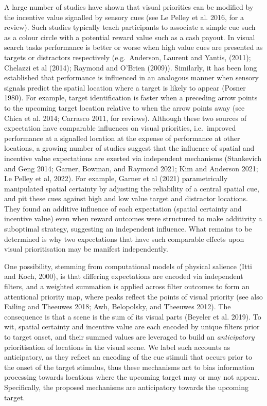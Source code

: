 \documentclass[11pt,halfline,a4paper,]{ouparticle}
\begin{document}
A large number of studies have shown that visual priorities can be modified by the incentive value signalled by sensory cues (see Le Pelley et al. 2016, for a review). Such studies typically teach participants to associate a simple cue such as a colour circle with a potential reward value such as a cash payout. In visual search tasks performance is better or worse when high value cues are presented as targets or distractors respectively (e.g.~Anderson, Laurent and Yantis, (2011); Chelazzi et al (2014); Raymond and O'Brien (2009)). Similarly, it has been long established that performance is influenced in an analogous manner when sensory signals predict the spatial location where a target is likely to appear (Posner 1980). For example, target identification is faster when a preceding arrow points to the upcoming target location relative to when the arrow points away (see Chica et al. 2014; Carrasco 2011, for reviews). Although these two sources of expectation have comparable influences on visual priorities, i.e.~improved performance at a signalled location at the expense of performance at other locations, a growing number of studies suggest that the influence of spatial and incentive value expectations are exerted via independent mechanisms (Stankevich and Geng 2014; Garner, Bowman, and Raymond 2021; Kim and Anderson 2021; Le Pelley et al, 2022). For example, Garner et al (2021) parametrically manipulated spatial certainty by adjusting the reliability of a central spatial cue, and pit these cues against high and low value target and distractor locations. They found an additive influence of each expectation (spatial certainty and incentive value) even when reward outcomes were structured to make additivity a suboptimal strategy, suggesting an independent influence. What remains to be determined is why two expectations that have such comparable effects upon visual prioritisation may be manifest independently.

One possibility, stemming from computational models of physical salience (Itti and Koch, 2000), is that differing expectations are encoded via independent filters, and a weighted summation is applied across filter outcomes to form an attentional priority map, where peaks reflect the points of visual priority (see also Failing and Theeuwes 2018; Awh, Belopolsky, and Theeuwes 2012). The consequence is that a scene is the sum of its visual parts (Beyeler et al. 2019). To wit, spatial certainty and incentive value are each encoded by unique filters prior to target onset, and their summed values are leveraged to build an \emph{anticipatory} prioritisation of locations in the visual scene. We label such accounts as anticipatory, as they reflect an encoding of the cue stimuli that occurs prior to the onset of the target stimulus, thus these mechanisms act to bias information processing towards locations where the upcoming target may or may not appear. Specifically, the proposed mechanisms are anticipatory towards the upcoming target.
\end{document}
